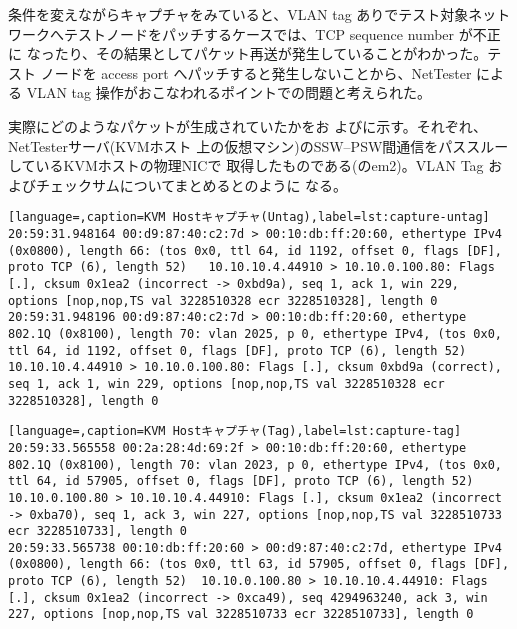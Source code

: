条件を変えながらキャプチャをみていると、VLAN tag ありでテスト対象ネット
ワークへテストノードをパッチするケースでは、TCP sequence number が不正に
なったり、その結果としてパケット再送が発生していることがわかった。テスト
ノードを access port へパッチすると発生しないことから、NetTester による
VLAN tag 操作がおこなわれるポイントでの問題と考えられた。

実際にどのようなパケットが生成されていたかをお
よびに示す。それぞれ、NetTesterサーバ(KVMホスト
上の仮想マシン)のSSW--PSW間通信をパススルーしているKVMホストの物理NICで
取得したものである(のem2)。VLAN Tag
およびチェックサムについてまとめるとのように
なる。

\begin{lstlisting}[language=,caption=KVM Hostキャプチャ(Untag),label=lst:capture-untag]
20:59:31.948164 00:d9:87:40:c2:7d > 00:10:db:ff:20:60, ethertype IPv4 (0x0800), length 66: (tos 0x0, ttl 64, id 1192, offset 0, flags [DF], proto TCP (6), length 52)	10.10.10.4.44910 > 10.10.0.100.80: Flags [.], cksum 0x1ea2 (incorrect -> 0xbd9a), seq 1, ack 1, win 229, options [nop,nop,TS val 3228510328 ecr 3228510328], length 0
20:59:31.948196 00:d9:87:40:c2:7d > 00:10:db:ff:20:60, ethertype 802.1Q (0x8100), length 70: vlan 2025, p 0, ethertype IPv4, (tos 0x0, ttl 64, id 1192, offset 0, flags [DF], proto TCP (6), length 52)	10.10.10.4.44910 > 10.10.0.100.80: Flags [.], cksum 0xbd9a (correct), seq 1, ack 1, win 229, options [nop,nop,TS val 3228510328 ecr 3228510328], length 0
\end{lstlisting}

\begin{lstlisting}[language=,caption=KVM Hostキャプチャ(Tag),label=lst:capture-tag]
20:59:33.565558 00:2a:28:4d:69:2f > 00:10:db:ff:20:60, ethertype 802.1Q (0x8100), length 70: vlan 2023, p 0, ethertype IPv4, (tos 0x0, ttl 64, id 57905, offset 0, flags [DF], proto TCP (6), length 52)	10.10.0.100.80 > 10.10.10.4.44910: Flags [.], cksum 0x1ea2 (incorrect -> 0xba70), seq 1, ack 3, win 227, options [nop,nop,TS val 3228510733 ecr 3228510733], length 0 
20:59:33.565738 00:10:db:ff:20:60 > 00:d9:87:40:c2:7d, ethertype IPv4 (0x0800), length 66: (tos 0x0, ttl 63, id 57905, offset 0, flags [DF], proto TCP (6), length 52)	10.10.0.100.80 > 10.10.10.4.44910: Flags [.], cksum 0x1ea2 (incorrect -> 0xca49), seq 4294963240, ack 3, win 227, options [nop,nop,TS val 3228510733 ecr 3228510733], length 0
\end{lstlisting}

